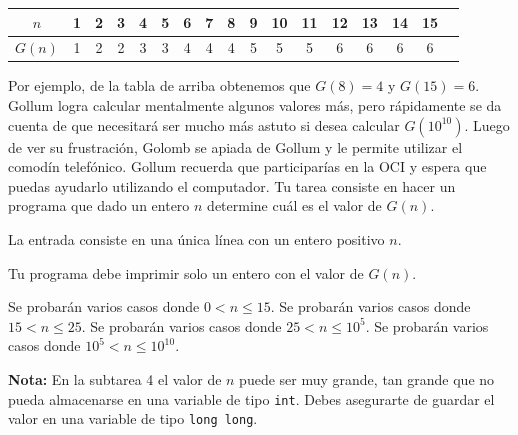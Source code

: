 \documentclass{oci}
\begin{document}
\begin{problemDescription}
\begin{center}
  \begin{tabular}{c|cccccccccccccccc}
	$n$ & 1 & 2 & 3 & 4 & 5 & 6 & 7 & 8 & 9 & 10 & 11 & 12 & 13 & 14 & 15 \\
  \hline
	$G(n)$ & 1 & 2 & 2 & 3 & 3 & 4 & 4 & 4 & 5 & 5 & 5 & 6 & 6 & 6 & 6 
  \end{tabular}
\end{center}
Por ejemplo, de la tabla de arriba obtenemos que $G(8)=4$ y $G(15)=6$. 
Gollum logra calcular mentalmente algunos valores más, pero rápidamente se da cuenta de que necesitará 
ser mucho más astuto si desea calcular $G(10^{10})$.
Luego de ver su frustración, Golomb se apiada de Gollum y le permite utilizar el comodín telefónico.
Gollum recuerda que participarías en la OCI y espera que puedas ayudarlo utilizando el computador.
Tu tarea consiste en hacer un programa que dado un entero $n$ determine cuál es el valor de $G(n)$.
\end{problemDescription}

\begin{inputDescription}
  La entrada consiste en una única línea con un entero positivo $n$.
\end{inputDescription}

\begin{outputDescription}
  Tu programa debe imprimir solo un entero con el valor de $G(n)$.
\end{outputDescription}

\begin{scoreDescription}
   Se probarán varios casos donde $0 < n \leq 15$.
   Se probarán varios casos donde $15 < n \leq 25$.
   Se probarán varios casos donde $25 < n \leq 10^5$.
   Se probarán varios casos donde $10^{5} < n \leq 10^{10}$.
\end{scoreDescription}
\textbf{Nota:} En la subtarea 4 el valor de $n$ puede ser muy grande, tan grande que no pueda almacenarse 
en una variable de tipo \texttt{int}. Debes asegurarte de guardar el valor en una variable de tipo \texttt{long long}.

\begin{sampleDescription}
\end{sampleDescription}

\cleardoublepage
\pagestyle{empty}
\begin{minipage}{\textwidth}
\end{minipage}
\end{document}
